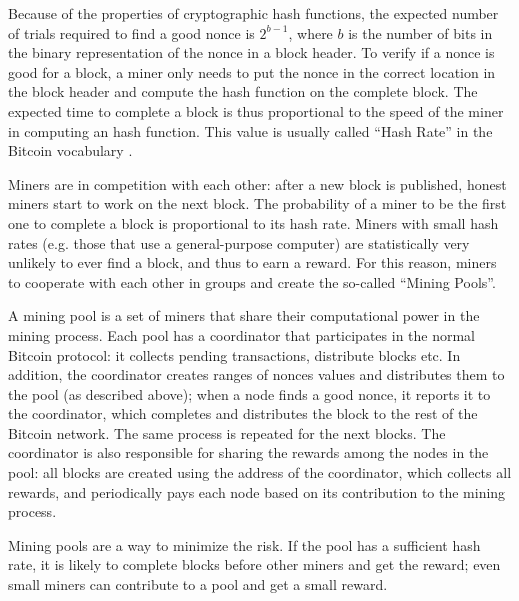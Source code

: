 Because of the properties of cryptographic hash functions, the expected number of trials required to find a good nonce is $2^{b - 1}$, where $b$ is the number of bits in the binary representation of the nonce in a block header.
To verify if a nonce is good for a block, a miner only needs to put the nonce in the correct location in the block header and compute the hash function on the complete block.
The expected time to complete a block is thus proportional to the speed of the miner in computing an hash function.
This value is usually called ``Hash Rate'' in the Bitcoin vocabulary \cite{bitcoin_vocabulary}.

Miners are in competition with each other:
after a new block is published, honest miners start to work on the next block.
The probability of a miner to be the first one to complete a block is proportional to its hash rate.
Miners with small hash rates (e.g. those that use a general-purpose computer) are statistically very unlikely to ever find a block, and thus to earn a reward.
For this reason, miners to cooperate with each other in groups and create the so-called ``Mining Pools''.

\bigskip
A mining pool is a set of miners that share their computational power in the mining process.
Each pool has a coordinator that participates in the normal Bitcoin protocol:
it collects pending transactions, distribute blocks etc.
In addition, the coordinator creates ranges of nonces values and distributes them to the pool (as described above);
when a node finds a good nonce, it reports it to the coordinator, which completes and distributes the block to the rest of the Bitcoin network.
The same process is repeated for the next blocks.
The coordinator is also responsible for sharing the rewards among the nodes in the pool:
all blocks are created using the address of the coordinator, which collects all rewards, and periodically pays each node based on its contribution to the mining process.

Mining pools are a way to minimize the risk.
If the pool has a sufficient hash rate, it is likely to complete blocks before other miners and get the reward;
even small miners can contribute to a pool and get a small reward.

